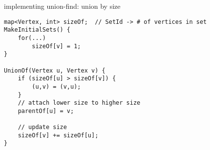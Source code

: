 \begin{frame}[fragile,label=unionFindBySize]{implementing union-find: union by size}
\begin{lstlisting}
map<Vertex, int> sizeOf;  // SetId -> # of vertices in set
MakeInitialSets() {
    for(...)
        sizeOf[v] = 1;
}

UnionOf(Vertex u, Vertex v) {
    if (sizeOf[u] > sizeOf[v]) {
        (u,v) = (v,u);
    }
    // attach lower size to higher size
    parentOf[u] = v;

    // update size
    sizeOf[v] += sizeOf[u];
}
\end{lstlisting}
\end{frame}
